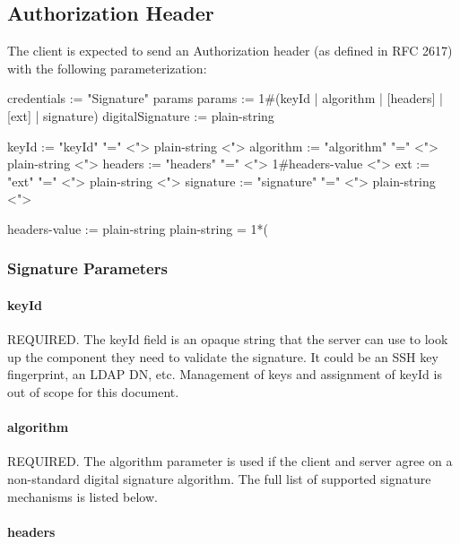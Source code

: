 \subsection*{Authorization Header}

The client is expected to send an Authorization header (as defined in R\+F\+C 2617) with the following parameterization\+: \begin{DoxyVerb}credentials := "Signature" params
params := 1#(keyId | algorithm | [headers] | [ext] | signature)
digitalSignature := plain-string

keyId := "keyId" "=" <"> plain-string <">
algorithm := "algorithm" "=" <"> plain-string <">
headers := "headers" "=" <"> 1#headers-value <">
ext := "ext" "=" <"> plain-string <">
signature := "signature" "=" <"> plain-string <">

headers-value := plain-string
plain-string   = 1*( %
\end{DoxyVerb}


\subsubsection*{Signature Parameters}

\paragraph*{key\+Id}

R\+E\+Q\+U\+I\+R\+E\+D. The {\ttfamily key\+Id} field is an opaque string that the server can use to look up the component they need to validate the signature. It could be an S\+S\+H key fingerprint, an L\+D\+A\+P D\+N, etc. Management of keys and assignment of {\ttfamily key\+Id} is out of scope for this document.

\paragraph*{algorithm}

R\+E\+Q\+U\+I\+R\+E\+D. The {\ttfamily algorithm} parameter is used if the client and server agree on a non-\/standard digital signature algorithm. The full list of supported signature mechanisms is listed below.

\paragraph*{headers}

